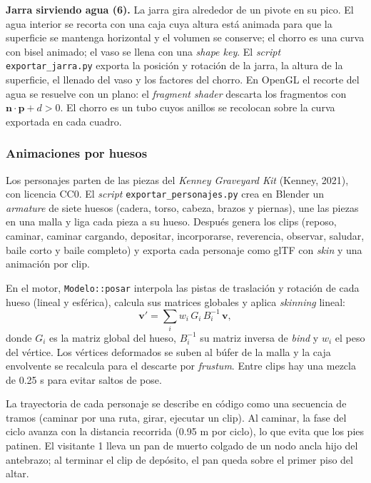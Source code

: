 \documentclass[letter,12pt]{article}
\begin{document}
	\textbf{Jarra sirviendo agua (6).} La jarra gira alrededor de un pivote en su pico. El agua interior se recorta con una caja cuya altura está animada para que la superficie se mantenga horizontal y el volumen se conserve; el chorro es una curva con bisel animado; el vaso se llena con una \textit{shape key}. El \textit{script} \texttt{exportar\_jarra.py} exporta la posición y rotación de la jarra, la altura de la superficie, el llenado del vaso y los factores del chorro. En OpenGL el recorte del agua se resuelve con un plano: el \textit{fragment shader} descarta los fragmentos con $\mathbf{n}\cdot\mathbf{p} + d > 0$. El chorro es un tubo cuyos anillos se recolocan sobre la curva exportada en cada cuadro.

	\subsubsection{Animaciones por huesos}
	Los personajes parten de las piezas del \textit{Kenney Graveyard Kit} (Kenney, 2021), con licencia CC0. El \textit{script} \texttt{exportar\_personajes.py} crea en Blender un \textit{armature} de siete huesos (cadera, torso, cabeza, brazos y piernas), une las piezas en una malla y liga cada pieza a su hueso. Después genera los clips (reposo, caminar, caminar cargando, depositar, incorporarse, reverencia, observar, saludar, baile corto y baile completo) y exporta cada personaje como glTF con \textit{skin} y una animación por clip.

	En el motor, \texttt{Modelo::posar} interpola las pistas de traslación y rotación de cada hueso (lineal y esférica), calcula sus matrices globales y aplica \textit{skinning} lineal:
	\begin{equation}
		\mathbf{v}' = \sum_{i} w_i \, G_i \, B_i^{-1} \, \mathbf{v},
	\end{equation}
	donde $G_i$ es la matriz global del hueso, $B_i^{-1}$ su matriz inversa de \textit{bind} y $w_i$ el peso del vértice. Los vértices deformados se suben al búfer de la malla y la caja envolvente se recalcula para el descarte por \textit{frustum}. Entre clips hay una mezcla de 0.25 s para evitar saltos de pose.

	La trayectoria de cada personaje se describe en código como una secuencia de tramos (caminar por una ruta, girar, ejecutar un clip). Al caminar, la fase del ciclo avanza con la distancia recorrida (0.95 m por ciclo), lo que evita que los pies patinen. El visitante 1 lleva un pan de muerto colgado de un nodo ancla hijo del antebrazo; al terminar el clip de depósito, el pan queda sobre el primer piso del altar.
\end{document}
